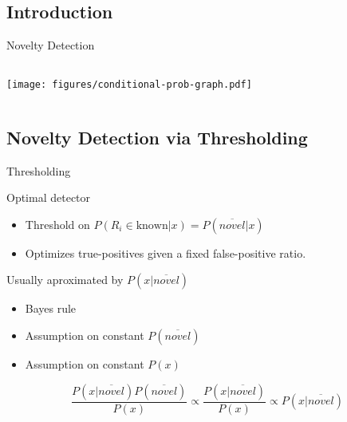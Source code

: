 \documentclass[compress]{beamer}
\begin{document}
\subsection{Introduction}
\begin{frame}{Novelty Detection}
    \begin{columns}[c]
        \centering
        \texttt{[image: figures/conditional-prob-graph.pdf]}

    \end{columns}
\end{frame}


\subsection{Novelty Detection via Thresholding}
\begin{frame}{Thresholding}
    \begin{block}
        {Optimal detector}
        \begin{itemize}
            \item Threshold on $P(R_i \in \text{known}|x) = P(\overline{novel}|x)$
            \item Optimizes true-positives given a fixed false-positive ratio.
        \end{itemize}
    \end{block}
    \begin{block}
        {Usually aproximated by $P(x|\overline{novel})$}
        \begin{itemize}
            \item Bayes rule
            \item Assumption on constant $P(\overline{novel})$
            \item Assumption on constant $P(x)$
        \end{itemize}

        \begin{equation*}
            \frac{P(x|\overline{novel})P(\overline{novel})}{P(x)} \propto \frac{P(x|\overline{novel})}{P(x)} \propto P(x|\overline{novel})
        \end{equation*}
    \end{block}
\end{frame}
\end{document}
